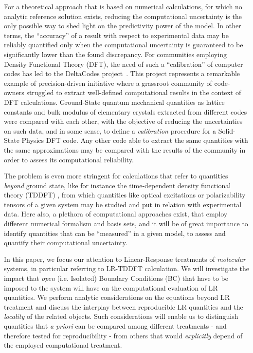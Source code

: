 \documentclass[reprint,aps,prb]{revtex4-1}
\begin{document}
For a theoretical approach that is based on numerical calculations, for which no analytic reference solution exists,
reducing the computational uncertainty is the only possible way to shed light on the predictivity power of the
model. In other terms, the ``accuracy'' of a result with respect to experimental data may be reliably quantified
only when the computational uncertainty is guaranteed to be significantly lower than the found discrepancy.
For communities employing Density Functional Theory (DFT), the need of such a ``calibration'' of computer codes has led to the DeltaCodes project~\cite{deltaTest2016}.
This project represents a remarkable example of precision-driven initiative where a grassroot community of code-owners struggled to extract
well-defined computational results in the context of DFT calculations. Ground-State quantum mechanical quantities
as lattice constants and bulk modulus of elementary crystals extracted from different codes were compared with each other, with the objective of reducing the uncertainties on such data, and in some sense, to define a \emph{calibration} procedure for a Solid-State Physics DFT code.
Any other code able to extract the same quantities with the same approximations may be compared with the
results of the community in order to assess its computational reliability.


The problem is even more stringent for calculations that refer to quantities \emph{beyond} ground state, like
for instance the time-dependent density functional theory (TDDFT) \cite{casida1995,runge1984,onida2002},
from which quantities like optical excitations or polarizability tensors
of a given system may be studied and put in relation with experimental data.
Here also, a plethora of computational approaches exist, that employ different numerical formalism and
basis sets, and it will be of great importance to identify quantities that can be ``measured'' in a given model, to assess
and quantify their computational uncertainty.

In this paper, we focus our attention to Linear-Response treatments of \emph{molecular} systems,
in particular referring to LR-TDDFT calculation. We will investigate the impact that
\emph{open} (i.e. Isolated) Boundary Conditions (BC) that have to be imposed to the system will have on the computational evaluation of LR quantities.
We perform analytic considerations on the equations beyond LR treatment and discuss the interplay between reproducible LR quantities and the \emph{locality} of the related objects. Such considerations will enable us to distinguish quantities that \textit{a priori} can be compared among different treatments - and therefore tested for reproducibility - from others that would \emph{explicitly} depend of the employed computational treatment.
\end{document}
